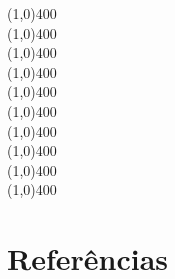 \begin{refsection}
\begin{center}
\noindent\line(1,0){400}\\
\line(1,0){400}\\
\line(1,0){400}\\
\line(1,0){400}\\
\line(1,0){400}\\
\line(1,0){400}\\
\line(1,0){400}\\
\line(1,0){400}\\
\line(1,0){400}\\
\line(1,0){400}\\
\end{center}

\section{Referências}\label{tut7:refs}
\printbibliography[heading=none]
\end{refsection}
%

